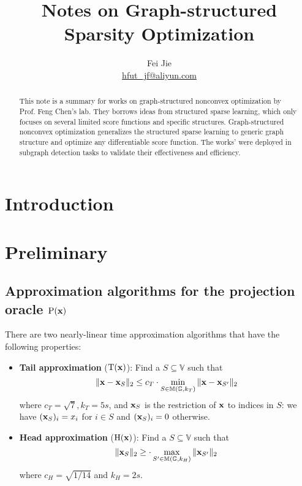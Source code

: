 \documentclass{article}
\title{Notes on Graph-structured Sparsity Optimization}
\author{Fei Jie \\ \href{mailto:hfut\_jf@aliyun.com}{hfut\_jf@aliyun.com}}
\begin{document}
\maketitle
\thispagestyle{firstpage}


\begin{abstract}
This note is a summary for works on graph-structured nonconvex optimization by Prof. Feng Chen's lab. They borrows ideas from structured sparse learning, which only focuses on several limited score functions and specific structures. Graph-structured nonconvex optimization generalizes the structured sparse learning to generic graph structure and optimize any differentiable score function. The works' were deployed in subgraph detection tasks to validate their effectiveness and efficiency.
\end{abstract}

\section{Introduction}


\section{Preliminary}

\subsection{Approximation algorithms for the projection oracle $\mathrm{P}({\bf x})$}

There are two nearly-linear time approximation algorithms \cite{hegde2015nearly} that have the following properties:
\begin{itemize}
	\item \textbf{Tail approximation} ($\mathrm{T}({\bf x})$): Find a $S\subseteq \mathbb{V}$ such that
	\begin{equation}
		\|{\bf x}-{\bf x}_S\|_2\leq c_T\cdot\min_{S
		\in\mathbb{M}(\mathbb{G},k_T)}\|{\bf x}-{\bf x}_{S'}\|_2
	\end{equation}
	where $c_T=\sqrt{7},k_T=5s$, and ${\bf x}_S$ is the restriction of ${\bf x}$ to indices in $S$: we have $({\bf x}_S)_i=x_i$ for $i\in S$ and $({\bf x}_S)_i = 0$ otherwise.
	\item \textbf{Head approximation} ($\mathrm{H}({\bf x})$): Find a $S\subseteq\mathbb{V}$ such that
	\begin{equation}
		\|{\bf x}_S\|_2\geq\cdot\max_{S'\in\mathbb{M}(\mathbb{G},k_H)}\|{\bf x}_{S'}\|_2
	\end{equation}
	where $c_H=\sqrt{1/14}$ and $k_H=2s$.
\end{itemize}
\end{document}
